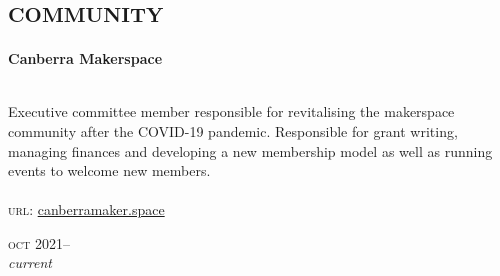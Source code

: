 
\section*{\textsc{community}}
\vspace{-0.2cm}

\begin{minipage}[t]{\mainboxwidth\textwidth}
\textbf{Canberra Makerspace}\\
\\
{\small
Executive committee member responsible for revitalising the makerspace community after the COVID-19 pandemic. Responsible for grant writing, managing finances and developing a new membership model as well as running events to welcome new members.
\\
\\
\textsc{url}: \href{https://canberramaker.space/}{canberramaker.space} 
\par}
\end{minipage}
\begin{minipage}[t]{\detailboxwidth\textwidth}
{
\hfill \textsc{oct} 2021--\\ 
\hspace*{0pt} \hfill \textit{\small current}
\par
}
\end{minipage}
\\


